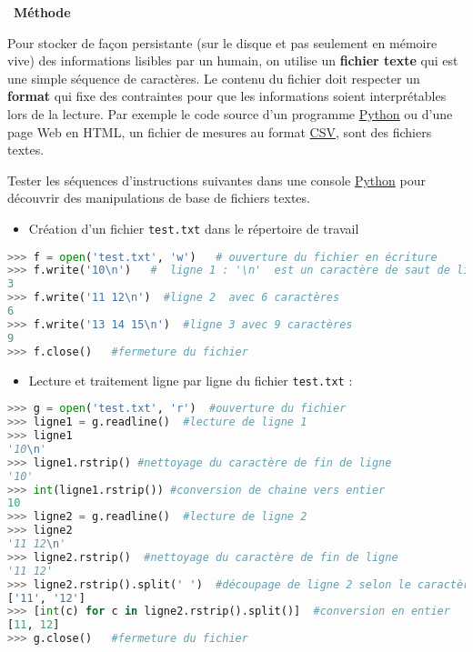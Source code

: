 \documentclass[
  11pt,
]{article}
\newcommand{\passthrough}[1]{#1}
\providecommand{\tightlist}{%
  \setlength{\itemsep}{0pt}\setlength{\parskip}{0pt}}
\newcounter{prog}
\newenvironment{methode}[1]
{\par \medskip    \noindent  
 \begin {bclogo}[arrondi =0.1,logo=\bcoutil, marge=4,noborder = true] {~\textbf{Méthode}   {\itshape #1} }  \par}
{
\end{bclogo}
 \par \bigskip }
\begin{document}
\begin{methode}{}

Pour stocker de façon persistante (sur le disque et pas seulement en
mémoire vive) des informations lisibles par un humain, on utilise un
\textbf{fichier texte} qui est une simple séquence de caractères. Le
contenu du fichier doit respecter un \textbf{format} qui fixe des
contraintes pour que les informations soient interprétables lors de la
lecture. Par exemple le code source d'un programme
\href{https://docs.python.org/3/tutorial/datastructures.html}{Python} ou
d'une page Web en HTML, un fichier de mesures au format
\href{https://fr.wikipedia.org/wiki/Comma-separated_values}{CSV}, sont
des fichiers textes.

Tester les séquences d'instructions suivantes dans une console
\href{https://docs.python.org/3/tutorial/datastructures.html}{Python}
pour découvrir des manipulations de base de fichiers textes.

\begin{itemize}
\tightlist
\item
  Création d'un fichier \passthrough{\lstinline!test.txt!} dans le
  répertoire de travail
\end{itemize}

\begin{lstlisting}[language=Python]
>>> f = open('test.txt', 'w')   # ouverture du fichier en écriture
>>> f.write('10\n')   #  ligne 1 : '\n'  est un caractère de saut de ligne
3
>>> f.write('11 12\n')  #ligne 2  avec 6 caractères 
6
>>> f.write('13 14 15\n')  #ligne 3 avec 9 caractères
9
>>> f.close()   #fermeture du fichier
\end{lstlisting}

\begin{itemize}
\tightlist
\item
  Lecture et traitement ligne par ligne du fichier
  \passthrough{\lstinline!test.txt!} :
\end{itemize}

\begin{lstlisting}[language=Python]
>>> g = open('test.txt', 'r')  #ouverture du fichier
>>> ligne1 = g.readline()  #lecture de ligne 1
>>> ligne1
'10\n'
>>> ligne1.rstrip() #nettoyage du caractère de fin de ligne
'10'
>>> int(ligne1.rstrip()) #conversion de chaine vers entier
10
>>> ligne2 = g.readline()  #lecture de ligne 2
>>> ligne2
'11 12\n'
>>> ligne2.rstrip()  #nettoyage du caractère de fin de ligne
'11 12'
>>> ligne2.rstrip().split(' ')  #découpage de ligne 2 selon le caractère par défaut de séparation ' ', on peut écrire juste split() 
['11', '12']
>>> [int(c) for c in ligne2.rstrip().split()]  #conversion en entier
[11, 12]
>>> g.close()   #fermeture du fichier
\end{lstlisting}

\end{methode}
\end{document}
